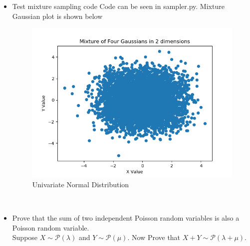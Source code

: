 \documentclass{article}
\begin{document}
\begin{itemize}
\item Test mixture sampling code
Code can be seen in sampler.py. Mixture Gaussian plot is shown below\\
\begin{figure}[h!]
	\centering
	\includegraphics[scale = 0.7]{MixtureGaussians.png}
	\caption{Univariate Normal Distribution}
\end{figure}\\
\pagebreak
\item Prove that the sum of two independent Poisson random variables is also a Poisson random variable.\\
Suppose $X \sim \mathcal{P}(\lambda)$ and $Y \sim \mathcal {P}(\mu)$. Now Prove that $X + Y \sim \mathcal{P}(\lambda + \mu)$.\\


\end{itemize}
\end{document}
